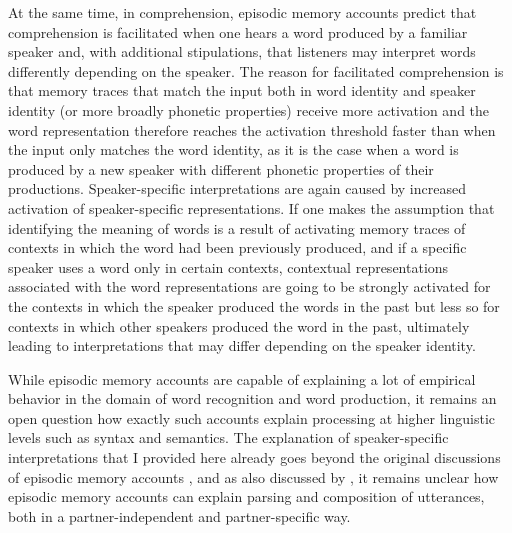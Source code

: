 At the same time, in comprehension, episodic memory accounts predict that comprehension is facilitated when one hears a word produced by a familiar speaker and, with additional stipulations,
that listeners may interpret words differently depending on the speaker. The reason for facilitated comprehension is that memory traces that match the input both in word identity and
speaker identity (or more broadly phonetic properties) receive more activation and the word representation therefore reaches the activation threshold faster than when the input
only matches the word identity, as it is the case when a word is produced by a new speaker with different phonetic properties of their productions.
Speaker-specific interpretations are again caused by increased activation of speaker-specific representations. If one makes the assumption that identifying the meaning of words is a result
of activating memory traces of contexts in which the word had been previously produced, and if a specific speaker uses a word only in certain contexts,  contextual representations
associated with the word representations are going to be strongly activated for the contexts in which the speaker produced the words in the past but  less so for contexts in which other speakers
produced the word in the past, ultimately leading to interpretations that may differ depending on the speaker identity.

While episodic memory accounts are capable of explaining a lot of empirical behavior in the domain of word recognition and word production,
it remains an open question how exactly such accounts explain processing at higher linguistic levels such as syntax and semantics. 
The explanation of speaker-specific interpretations that I provided here already goes beyond the original discussions of episodic memory accounts
\parencite[though see, for example,][for episodic memory accounts of partner-specific productions and
comprehension of referring expressions]{Horton2005,Horton2016}, and as also discussed by \textcite{Goldinger1998}, it remains unclear how episodic memory accounts
can explain parsing and composition of utterances, both in a partner-independent and partner-specific way.

